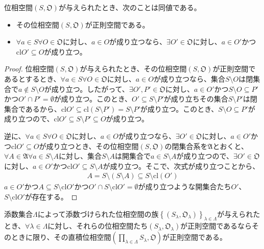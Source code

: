 \documentclass[dvipdfmx]{jsarticle}
\begin{document}
\begin{thm}\label{8.1.7.12}
位相空間$\left( S,\mathfrak{O} \right)$が与えられたとき、次のことは同値である。
\begin{itemize}
\item
  その位相空間$\left( S,\mathfrak{O} \right)$が正則空間である。
\item
  $\forall a \in S\forall O \in \mathfrak{O}$に対し、$a \in O$が成り立つなら、$\exists O'\in \mathfrak{O}$に対し、$a \in O'$かつ${\mathrm{cl}}O' \subseteq O$が成り立つ。
\end{itemize}
\end{thm}
\begin{proof}
位相空間$\left( S,\mathfrak{O} \right)$が与えられたとき、その位相空間$\left( S,\mathfrak{O} \right)$が正則空間であるとするとき、$\forall a \in S\forall O \in \mathfrak{O}$に対し、$a \in O$が成り立つなら、集合$S \setminus O$は閉集合で$a \notin S \setminus O$が成り立つ。したがって、$\exists O',P'\in \mathfrak{O}$に対し、$a \in O'$かつ$S \setminus O \subseteq P'$かつ$O' \cap P' = \emptyset$が成り立つ。このとき、$O' \subseteq S \setminus P'$が成り立ちその集合$S \setminus P'$は閉集合であるから、${\mathrm{cl}}O' \subseteq {\mathrm{cl}}\left( S \setminus P' \right) = S \setminus P'$が成り立つ。このとき、$S \setminus O \subseteq P'$が成り立つので、${\mathrm{cl}}O' \subseteq S \setminus P' \subseteq O$が成り立つ。\par
逆に、$\forall a \in S\forall O \in \mathfrak{O}$に対し、$a \in O$が成り立つなら、$\exists O'\in \mathfrak{O}$に対し、$a \in O'$かつ${\mathrm{cl}}O' \subseteq O$が成り立つとき、その位相空間$\left( S,\mathfrak{O} \right)$の閉集合系を$\mathfrak{A}$とおくと、$\forall A \in \mathfrak{A\forall}a \in S \setminus A$に対し、集合$S \setminus A$は開集合で$a \in S \setminus A$が成り立つので、$\exists O'\in \mathfrak{O}$に対し、$a \in O'$かつ${\mathrm{cl}}O' \subseteq S \setminus A$が成り立つ。そこで、次式が成り立つことから、
\begin{align*}
A = S \setminus (S \setminus A) \subseteq S \setminus {\mathrm{cl}}\left( O' \right)
\end{align*}
$a \in O'$かつ$A \subseteq S \setminus {\mathrm{cl}}O'$かつ$O' \cap S \setminus {\mathrm{cl}}O' = \emptyset$が成り立つような開集合たち$O'$、$S \setminus {\mathrm{cl}}O'$が存在する。
\end{proof}
\begin{thm}\label{8.1.7.13}
添数集合$\varLambda$によって添数づけられた位相空間の族$\left\{ \left( S_{\lambda},\mathfrak{O}_{\lambda} \right) \right\}_{\lambda \in \varLambda}$が与えられたとき、$\forall\lambda \in \varLambda$に対し、それらの位相空間たち$\left( S_{\lambda},\mathfrak{O}_{\lambda} \right)$が正則空間であるならそのときに限り、その直積位相空間$\left( \prod_{\lambda \in \varLambda} S_{\lambda},\mathfrak{O} \right)$が正則空間である。
\end{thm}
\end{document}
